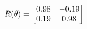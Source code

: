\documentclass[preview]{standalone}
\begin{document}
\begin{align*}
\special{dvisvgm:raw <g id='unique000'>}R(\theta) = \begin{bmatrix}0.98 & -0.19\\0.19 & 0.98\end{bmatrix}\special{dvisvgm:raw </g>}
\end{align*}
\end{document}
